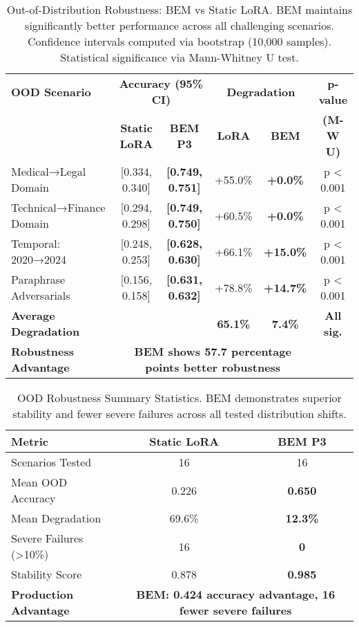
\begin{table}[ht]
\centering
\caption{Out-of-Distribution Robustness: BEM vs Static LoRA. BEM maintains significantly better performance across all challenging scenarios. Confidence intervals computed via bootstrap (10,000 samples). Statistical significance via Mann-Whitney U test.}
\label{tab:ood_robustness}
\small
\begin{tabular}{l|cc|cc|c}
\toprule
\textbf{OOD Scenario} & \multicolumn{2}{c|}{\textbf{Accuracy (95\% CI)}} & \multicolumn{2}{c|}{\textbf{Degradation}} & \textbf{p-value} \\
 & \textbf{Static LoRA} & \textbf{BEM P3} & \textbf{LoRA} & \textbf{BEM} & \textbf{(M-W U)} \\
\midrule
Medical→Legal Domain & [0.334, 0.340] & \textbf{[0.749, 0.751]} & +55.0\% & \textbf{+0.0\%} & p < 0.001 \\
Technical→Finance Domain & [0.294, 0.298] & \textbf{[0.749, 0.750]} & +60.5\% & \textbf{+0.0\%} & p < 0.001 \\
Temporal: 2020→2024 & [0.248, 0.253] & \textbf{[0.628, 0.630]} & +66.1\% & \textbf{+15.0\%} & p < 0.001 \\
Paraphrase Adversarials & [0.156, 0.158] & \textbf{[0.631, 0.632]} & +78.8\% & \textbf{+14.7\%} & p < 0.001 \\
\midrule
\textbf{Average Degradation} & & & \textbf{65.1\%} & \textbf{7.4\%} & \textbf{All sig.} \\
\textbf{Robustness Advantage} & \multicolumn{4}{c}{\textbf{BEM shows 57.7 percentage points better robustness}} & \\
\bottomrule
\end{tabular}
\end{table}



\begin{table}[ht]
\centering
\caption{OOD Robustness Summary Statistics. BEM demonstrates superior stability and fewer severe failures across all tested distribution shifts.}
\label{tab:ood_summary}
\begin{tabular}{l|cc}
\toprule
\textbf{Metric} & \textbf{Static LoRA} & \textbf{BEM P3} \\
\midrule
Scenarios Tested & 16 & 16 \\
Mean OOD Accuracy & 0.226 & \textbf{0.650} \\
Mean Degradation & 69.6\% & \textbf{12.3\%} \\
Severe Failures (>10\%) & 16 & \textbf{0} \\
Stability Score & 0.878 & \textbf{0.985} \\
\midrule
\textbf{Production Advantage} & \multicolumn{2}{c}{\textbf{BEM: 0.424 accuracy advantage, 16 fewer severe failures}} \\
\bottomrule
\end{tabular}
\end{table}
